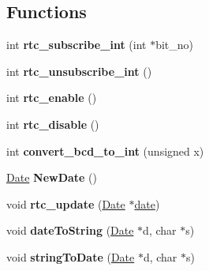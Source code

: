 \subsection*{Functions}
\begin{DoxyCompactItemize}
\item 
\mbox{\label{group__RTC_ga9cd331d02770769212ebe28ccf872789}} 
int {\bfseries rtc\+\_\+subscribe\+\_\+int} (int $\ast$bit\+\_\+no)
\item 
\mbox{\label{group__RTC_gab8f17bf5280c908c8b199a90fefcc758}} 
int {\bfseries rtc\+\_\+unsubscribe\+\_\+int} ()
\item 
\mbox{\label{group__RTC_ga8063dcc3f1e95d1f5a2e7d999c64444a}} 
int {\bfseries rtc\+\_\+enable} ()
\item 
\mbox{\label{group__RTC_ga4b93d85bfaf9ec3c55a66ba7c454881e}} 
int {\bfseries rtc\+\_\+disable} ()
\item 
\mbox{\label{group__RTC_gaf994ea35fce52417240582e0f644aecf}} 
int {\bfseries convert\+\_\+bcd\+\_\+to\+\_\+int} (unsigned x)
\item 
\mbox{\label{group__RTC_ga8397d4d0c596d7fe05eeccb0c3862132}} 
\hyperlink{structdate}{Date} {\bfseries New\+Date} ()
\item 
\mbox{\label{group__RTC_gaf45b0afaf42a071caaee55f8d2b4ddb4}} 
void {\bfseries rtc\+\_\+update} (\hyperlink{structdate}{Date} $\ast$\hyperlink{structdate}{date})
\item 
\mbox{\label{group__RTC_ga67f5c9efefa63be9626d246609d17383}} 
void {\bfseries date\+To\+String} (\hyperlink{structdate}{Date} $\ast$d, char $\ast$s)
\item 
\mbox{\label{group__RTC_ga2dc333527ee558ba03af942d7c6a3f37}} 
void {\bfseries string\+To\+Date} (\hyperlink{structdate}{Date} $\ast$d, char $\ast$s)
\end{DoxyCompactItemize}
